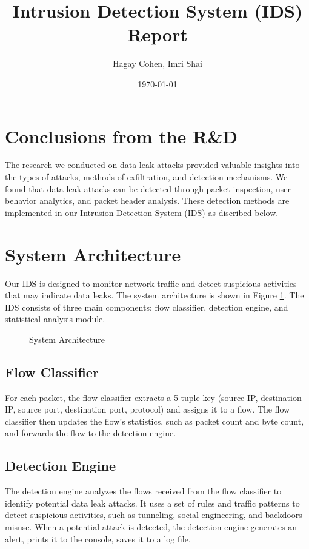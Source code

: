 \documentclass{article}
\title{Intrusion Detection System (IDS) Report}
\author{Hagay Cohen, Imri Shai}
\date{\today}
\begin{document}
\maketitle

\section{Conclusions from the R\&D}
The research we conducted on data leak attacks provided valuable insights into the types of attacks, methods of exfiltration, and detection mechanisms. We found that data leak attacks can be detected through packet inspection, user behavior analytics, and packet header analysis. These detection methods are implemented in our Intrusion Detection System (IDS) as discribed below.


\section{System Architecture}
Our IDS is designed to monitor network traffic and detect suspicious activities that may indicate data leaks. 
The system architecture is shown in Figure \ref{fig:architecture}.
The IDS consists of three main components: flow classifier, detection engine, and statistical analysis module.
\begin{figure}[h!]
    \centering
    \caption{System Architecture}
    \label{fig:architecture}
\end{figure}

\subsection{Flow Classifier}
For each packet, the flow classifier extracts a 5-tuple key (source IP, destination IP, source port, destination port, protocol) and assigns it to a flow.
The flow classifier then updates the flow's statistics, such as packet count and byte count, and forwards the flow to the detection engine.

\subsection{Detection Engine}
The detection engine analyzes the flows received from the flow classifier to identify potential data leak attacks.
It uses a set of rules and traffic patterns to detect suspicious activities, such as tunneling, social engineering, and backdoors misuse.
When a potential attack is detected, the detection engine generates an alert, prints it to the console, saves it to a log file.
\end{document}
